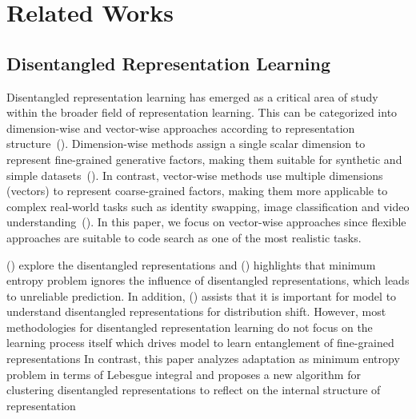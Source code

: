 \section{Related Works}

\subsection{Disentangled Representation Learning}
Disentangled representation learning has emerged as a critical area of study within the broader field of representation learning.
This can be categorized into dimension-wise and vector-wise approaches according to representation structure~(\cite{WangCTWZ22}).
Dimension-wise methods assign a single scalar dimension to represent fine-grained generative factors, 
making them suitable for synthetic and simple datasets~(\cite{ChenDHSSA16, JeonLPK21, LinKFO19, XiaoHM17}).
In contrast, vector-wise methods use multiple dimensions (vectors) to represent coarse-grained factors, 
making them more applicable to complex real-world tasks such as identity swapping, 
image classification and video understanding~(\cite{TranYL17, LiuLNXZ21, Denton17, WangCTWZ22}).
In this paper, we focus on vector-wise approaches 
since flexible approaches are suitable to code search as one of the most realistic tasks.

(\cite{WilesGSRKDC22, LeeJLPSHY24}) explore the disentangled representations and (\cite{LeeJLPSHY24}) highlights 
that minimum entropy problem ignores the influence of disentangled representations, 
which leads to unreliable prediction.
In addition, (\cite{WilesGSRKDC22}) assists that it is important 
for model to understand disentangled representations for distribution shift.
However, most methodologies for disentangled representation learning do not focus on 
the learning process itself which drives model to learn entanglement of fine-grained representations
In contrast, this paper analyzes adaptation as minimum entropy problem in terms of Lebesgue integral 
and proposes a new algorithm for clustering disentangled representations 
to reflect on the internal structure of representation

